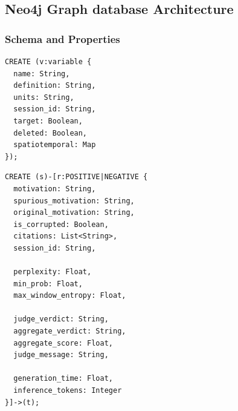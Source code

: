 

\subsection{Neo4j Graph database Architecture}

\subsubsection{Schema and Properties}
\begin{verbatim}
CREATE (v:variable {
  name: String,
  definition: String,
  units: String,
  session_id: String,
  target: Boolean,
  deleted: Boolean,
  spatiotemporal: Map
});
\end{verbatim}

\begin{verbatim}
CREATE (s)-[r:POSITIVE|NEGATIVE {
  motivation: String,
  spurious_motivation: String,
  original_motivation: String,
  is_corrupted: Boolean,
  citations: List<String>,
  session_id: String,

  perplexity: Float,
  min_prob: Float,
  max_window_entropy: Float,

  judge_verdict: String,
  aggregate_verdict: String,
  aggregate_score: Float,
  judge_message: String,

  generation_time: Float,
  inference_tokens: Integer
}]->(t);
\end{verbatim}

